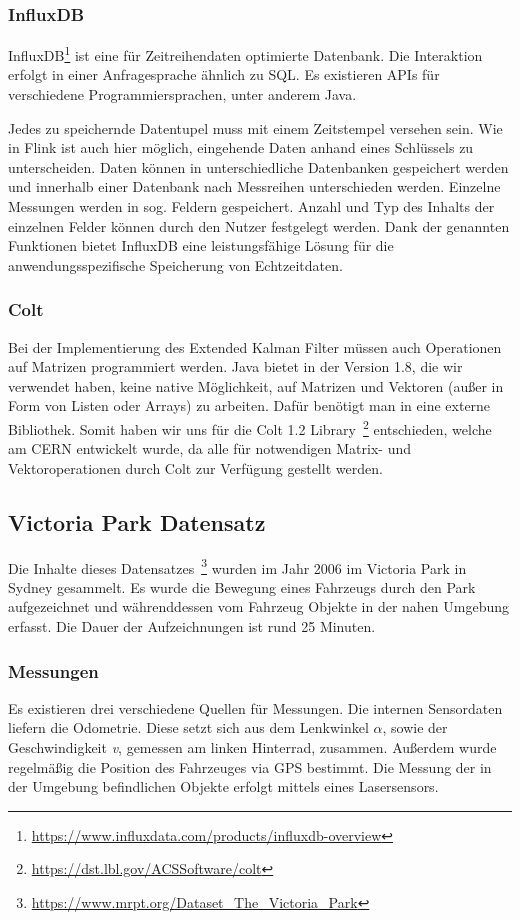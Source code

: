 \documentclass[11pt]{scrartcl}
\begin{document}
\subsubsection{InfluxDB}
InfluxDB\footnote{\url{https://www.influxdata.com/products/influxdb-overview}} ist eine für Zeitreihendaten optimierte Datenbank. Die Interaktion erfolgt in einer Anfragesprache ähnlich zu SQL. Es existieren APIs für verschiedene Programmiersprachen, unter anderem Java. 

Jedes zu speichernde Datentupel muss mit einem Zeitstempel versehen sein. Wie in Flink ist auch hier möglich, eingehende Daten anhand eines Schlüssels zu unterscheiden. Daten können in unterschiedliche Datenbanken gespeichert werden und innerhalb einer Datenbank nach Messreihen unterschieden werden. Einzelne Messungen werden in sog. Feldern gespeichert. Anzahl und Typ des Inhalts der einzelnen Felder können durch den Nutzer festgelegt werden. Dank der genannten Funktionen bietet InfluxDB eine leistungsfähige Lösung für die anwendungsspezifische Speicherung von Echtzeitdaten.

\subsubsection{Colt}
Bei der Implementierung des Extended Kalman Filter müssen auch Operationen auf Matrizen programmiert werden. Java bietet in der Version 1.8, die wir verwendet haben, keine native Möglichkeit, auf Matrizen und Vektoren (außer in Form von Listen oder Arrays) zu arbeiten. Dafür benötigt man in eine externe Bibliothek. Somit haben wir uns für die Colt 1.2 Library~\footnote{\url{https://dst.lbl.gov/ACSSoftware/colt}} entschieden, welche am CERN entwickelt wurde, da alle für notwendigen Matrix- und Vektoroperationen durch Colt zur Verfügung gestellt werden.

\subsection{Victoria Park Datensatz}\label{Datensatz}
Die Inhalte dieses Datensatzes~\footnote{\url{https://www.mrpt.org/Dataset_The_Victoria_Park}} wurden im Jahr 2006 im Victoria Park in Sydney gesammelt. Es wurde die Bewegung eines Fahrzeugs durch den Park aufgezeichnet und währenddessen vom Fahrzeug Objekte in der nahen Umgebung erfasst. Die Dauer der Aufzeichnungen ist rund 25 Minuten.

\subsubsection{Messungen}
Es existieren drei verschiedene Quellen für Messungen. Die internen Sensordaten liefern die Odometrie. Diese setzt sich aus dem Lenkwinkel \(\alpha\), sowie der Geschwindigkeit \textit{v}, gemessen am linken Hinterrad, zusammen. Außerdem wurde regelmäßig die Position des Fahrzeuges via GPS bestimmt. Die Messung der in der Umgebung befindlichen Objekte erfolgt mittels eines Lasersensors.
\end{document}
